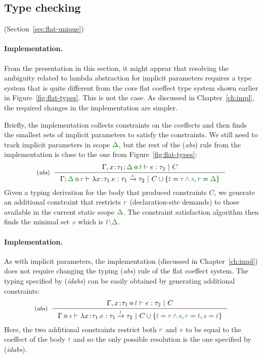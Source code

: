 \subsection{Type checking}
\label{sec:impl-theory-typing}


(Section~\ref{sec:flat-unique})

\paragraph{Implementation.}
From the presentation in this section, it might appear that resolving the ambiguity related to
lambda abstraction for implicit parameters requires a type system that is quite different from
the core flat coeffect type system shown earlier in Figure~\ref{fig:flat-types}. This is not the
case. As discussed in Chapter~\ref{ch:impl}, the required changes in the implementation are
simpler.

Briefly, the implementation collects constraints on the coeffects and then finds the smallest sets
of implicit parameters to satisfy the constraints. We still need to track implicit parameters in
scope $\cclrd{\Delta}$, but the rest of the (\emph{abs}) rule from the implementation is close
to the one from Figure~\ref{fig:flat-types}:
%
\begin{equation*}
\tyrule{abs}
  {\coctx{\Gamma, x\!:\!\tau_1;\cclrd{\Delta}}{\cclrd{t}} \vdash e : \tau_2 ~|~ C}
  {\coctx{\Gamma;\cclrd{\Delta}}{\cclrd{r}} \vdash \lambda x\!:\!\tau_1.e : \tau_1 \xrightarrow{\cclrd{s}} \tau_2 ~|~
    C\cup\{\cclrd{t}=\cclrd{r} \,\czip\, \cclrd{s}, \cclrd{r}=\cclrd{\Delta} \}}
\end{equation*}
%
Given a typing derivation for the body that produced constraints $C$, we generate an additional
constraint that restricts $\cclrd{r}$ (declaration-site demands) to those available in the
current static scope $\cclrd{\Delta}$. The constraint satisfaction algorithm then finds
the minimal set $\cclrd{s}$ which is $\cclrd{t}\cclrd{\setminus \Delta}$.

\paragraph{Implementation.}
As with implicit parameters, the implementation (discussed in Chapter~\ref{ch:impl}) does not
require changing the typing (\emph{abs}) rule of the flat coeffect system. The typing specified
by (\emph{idabs}) can be easily obtained by generating additional constraints:
%
\begin{equation*}
\tyrule{abs}
  {\coctx{\Gamma, x\!:\!\tau_1}{\cclrd{t}} \vdash e : \tau_2 ~|~ C}
  {\coctx{\Gamma}{\cclrd{s}} \vdash \lambda x\!:\!\tau_1.e : \tau_1 \xrightarrow{\cclrd{t}} \tau_2 ~|~
    C\cup\{\cclrd{t}=\cclrd{r} \,\czip\, \cclrd{s}, \cclrd{r}=\cclrd{t}, \cclrd{s}=\cclrd{t} \}}
\end{equation*}
%
Here, the two additional constraints restrict both $\cclrd{r}$ and $\cclrd{s}$ to be equal to the
coeffect of the body $\cclrd{t}$ and so the only possible resolution is the one specified by
(\emph{idabs}).


